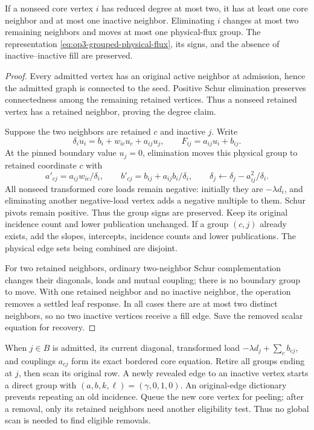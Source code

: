 \begin{lemma}
\label{lem:op3-live-core-removal}
If a nonseed core vertex $i$ has reduced degree at most two, it has at
least one core neighbor and at most one inactive neighbor. Eliminating
$i$ changes at most two remaining neighbors and moves at most one
physical-flux group. The representation
\cref{eq:op3-grouped-physical-flux}, its signs, and the absence of
inactive--inactive fill are preserved.
\end{lemma}
\begin{proof}
Every admitted vertex has an original active neighbor at admission, hence
the admitted graph is connected to the seed. Positive Schur elimination
preserves connectedness among the remaining retained vertices. Thus a
nonseed retained vertex has a retained neighbor, proving the degree claim.

Suppose the two neighbors are retained $c$ and inactive $j$. Write
\[
 \delta_i u_i=b_i+w_{ic}u_c+a_{ij}u_j,
 \qquad F_{ij}=a_{ij}u_i+b_{ij}.
\]
At the pinned boundary value $u_j=0$, elimination moves this physical group
to retained coordinate $c$ with
\begin{equation}
 a'_{cj}=a_{ij}w_{ic}/\delta_i,\qquad
 b'_{cj}=b_{ij}+a_{ij}b_i/\delta_i,
 \qquad \delta_j\leftarrow\delta_j-a_{ij}^2/\delta_i.
 \label{eq:op3-live-core-group-move}
\end{equation}
All nonseed transformed core loads remain negative: initially they are
$-\lambda d_i$, and eliminating another negative-load vertex adds a
negative multiple to them. Schur pivots remain positive. Thus the group
signs are preserved. Keep its original incidence count and lower
publication unchanged. If a group $(c,j)$ already exists, add the slopes,
intercepts, incidence counts and lower publications. The physical edge
sets being combined are disjoint.

For two retained neighbors, ordinary two-neighbor Schur complementation
changes their diagonals, loads and mutual coupling; there is no boundary
group to move. With one retained neighbor and no inactive neighbor, the
operation removes a settled leaf response. In all cases there are at most
two distinct neighbors, so no two inactive vertices receive a fill edge.
Save the removed scalar equation for recovery.
\end{proof}

When $j\in B$ is admitted, its current diagonal, transformed load
$-\lambda d_j+\sum_c b_{cj}$, and couplings $a_{cj}$ form its exact
bordered core equation. Retire all groups ending at $j$, then scan its
original row. A newly revealed edge to an inactive vertex starts a direct
group with $(a,b,k,\ell)=(\gamma,0,1,0)$. An original-edge dictionary
prevents repeating an old incidence. Queue the new core vertex for peeling;
after a removal, only its retained neighbors need another eligibility test.
Thus no global scan is needed to find eligible removals.

